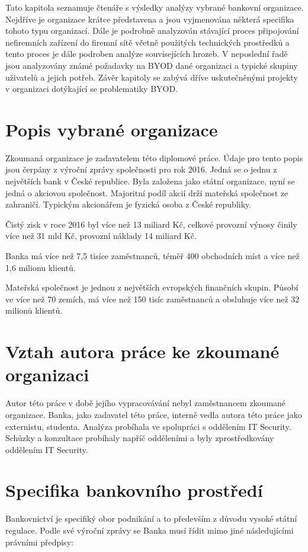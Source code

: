 Tato kapitola seznamuje čtenáře s výsledky analýzy vybrané bankovní organizace. Nejdříve je organizace krátce představena a jsou vyjmenována některá specifika tohoto typu organizací. Dále je podrobně analyzován stávající proces připojování nefiremních zařízení do firemní sítě včetně použitých technických prostředků a tento proces je dále podroben analýze souvisejících hrozeb. V neposlední řadě jsou analyzovány známé požadavky na BYOD dané organizaci a typické skupiny uživatelů a jejich potřeb. Závěr kapitoly se zabývá dříve uskutečněnými projekty v organizaci dotýkající se problematiky BYOD.

\section{Popis vybrané organizace}
Zkoumaná organizace je zadavatelem této diplomové práce. Údaje pro tento popis jsou čerpány z výroční zprávy společnosti pro rok 2016. Jedná se o jednu z největších bank v České republice. Byla založena jako státní organizace, nyní se jedná o akciovou společnost. Majoritní podíl akcií drží mateřská společnost ze zahraničí. Typickým akcionářem je fyzická osoba z České republiky.

Čistý zisk v roce 2016 byl více než 13 miliard Kč, celkové provozní výnosy činily více než 31 mld Kč, provozní náklady 14 miliard Kč.

Banka má více než 7,5 tisíce zaměstnanců, téměř 400 obchodních míst a více než 1,6 milionu klientů.  

Mateřská společnost je jednou z největších evropských finančních skupin. Působí ve více než 70 zemích, má více než 150 tisíc zaměstnanců a obsluhuje více než 32 milionů klientů. 

\section{Vztah autora práce ke zkoumané organizaci}
Autor této práce v době jejího vypracovávání nebyl zaměstnancem zkoumané organizace. Banka, jako zadavatel této práce, interně vedla autora této práce jako externistu, studenta. Analýza probíhala ve spolupráci s oddělením IT Security. Schůzky a konzultace probíhaly napříč odděleními a byly zprostředkovány oddělením IT Security. 

\section{Specifika bankovního prostředí}
Bankovnictví je specifiký obor podnikání a to především z důvodu vysoké státní regulace. Podle své výroční zprávy se Banka musí řídit mimo jiné následujícími právními předpisy:

